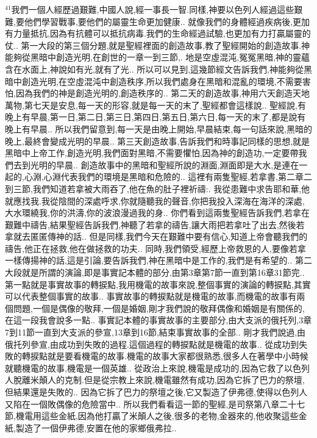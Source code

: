 \documentclass{book}
\begin{document}
$^{41}$我們一個人經歷過艱難,中國人說,經一事長一智.同樣,神要以色列人經過這些艱難,要他們學習戰事,要他們的屬靈生命更加健康..
就像我們的身體經過疾病後,更加有力量抵抗,因為有抗體可以抵抗病毒.我們的生命經過試驗,也更加有力打贏屬靈的仗..
第一大段的第三個分題,就是聖經裡面的創造故事,教了聖經開始的創造故事.神能夠從黑暗中創造光明,在創世的一章一到三節,.
地是空虛混沌,冤冤黑暗,神的靈蘊含在水面上,神說如有光,就有了光..
所以可以見到,這幾節經文告訴我們,神能夠從黑暗中創造光明,在空虛混沌中創造秩序,所以我們處身在黑暗和混亂的環境,不需要害怕,因為我們的神是創造光明的,創造秩序的..
第二天的創造故事,神用六天創造天地萬物,第七天是安息,每一天的形容,就是每一天的末了,聖經都會這樣說..
聖經說,有晚上有早晨,第一日,第二日,第三日,第四日,第五日,第六日,每一天的末了,都是說有晚上有早晨..
所以我們留意到,每一天是由晚上開始,早晨結束,每一句話來說,黑暗的晚上,最終會變成光明的早晨..
第三天創造故事,告訴我們和時事記同樣的思想,就是黑暗中上帝工作,創造光明,我們面對黑暗,不需要懼怕,因為神的創造功,一定要帶我們去到光明的早晨..
創造故事中的黑暗和聖經所說的淵面,淵面即是大水,是連在一起的,心淵,心淵代表我們的環境是黑暗和危險的..
這裡有兩隻聖經,若拿書,第二章二到三節,我們知道若拿被大雨吞了,他在魚的肚子裡祈禱:.
我從患難中求告耶和華,他就應找我.我從陰間的深處呼求,你就隨聽我的聲音,你把我投入深海在海洋的深處,大水環繞我,你的洪濤,你的波浪漫過我的身..
你們看到這兩隻聖經告訴我們,若拿在艱難中禱告,結果聖經告訴我們,神聽了若拿的禱告,讓大雨把若拿吐了出去,然後若拿就去匿匿傳神的話..
但是同樣,我們今天在艱難中要有信心,知道上帝會聽我們的禱告,他正在拯救,他在做拯救的功夫..
同時,我們領受,經歷上帝救恩的人,要像若拿一樣傳揚神的話,這是引論,要告訴我們,神在黑暗中是工作的,我們是有希望的..
第二大段就是所謂的演論,即是事實記本體的部分,由第3章第7節一直到第16章31節完..
第一點就是事實故事的轉捩點,我用機電的故事來說,整個事實的演論的轉捩點,其實可以代表整個事實的故事..
事實故事的轉捩點就是機電的故事,而機電的故事有兩個問題,一個是偶像的敬拜,一個是婚姻,剛才我們說的敬拜偶像和婚姻是有關係的,在這一段我會說多一點..
事實記本體的事實故事的主要部分,由大支派的俄托列,3章7到11節一直到大支派的參宣,13章到16節,結束事實故事的全部..
剛才我們說過,由俄托列參宣,由成功到失敗的過程.這個過程的轉捩點就是機電的故事..
從成功到失敗的轉捩點就是要看機電的故事.機電的故事大家都很熟悉,很多人在著學中小時候就聽機電的故事,機電是一個英雄..
從政治上來說,機電是成功的,因為它救了以色列人脫離米顛人的克制.但是從宗教上來說,機電雖然有成功,因為它拆了巴力的祭壇,但結果還是失敗的..
因為它拆了巴力的祭壇之後,它又製造了伊弗德,使得以色列人又陷在一個敗偶像的危險當中..
所以我們看看這一節的聖經,是司祭第八章二十七節,機電用這些金紙,因為他打贏了米顛人之後,很多的老物,金器來的,他收聚這些金紙,製造了一個伊弗德,安置在他的家鄉俄弗拉..
\end{document}
